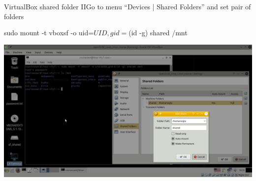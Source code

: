 \documentclass[compress, ucs, xelatex, 11pt, xcolor=svgnames,
  hyperref={
    bookmarks=true,
    unicode=true,
    colorlinks=true,
    pdftitle={Linux, command line and MetaCentrum},
    plainpages=false,
    pdfauthor={Vojtech Zeisek},
    pdfsubject={Course about use of Linux command line, writing shell scripts and using MetaCentrum of CESNET},
    pdfcreator={XeLaTeX},
    pdfkeywords={Linux, GNU, BASH, shell, command line, MetaCentrum},
    linkcolor=DarkRed,
    anchorcolor=DarkBlue,
    citecolor=Indigo,
    filecolor=NavyBlue,
    menucolor=DarkMagenta,
    urlcolor=DarkBlue,
    pdftex},
  url={hyphens, lowtilde} %
  ]{beamer}
\begin{document}
\begin{frame}[fragile]{VirtualBox shared folder II}{Go to menu ``Devices | Shared Folders'' and set pair of folders}
  \begin{bashcode}
    sudo mount -t vboxsf -o uid=$UID,gid=$(id -g) shared /mnt
  \end{bashcode}
  \vfil
  \begin{center}
    \includegraphics[width=\textwidth-1cm]{virtualbox_shared_folder_2.png}
  \end{center}
  \vfill
\end{frame}
\end{document}
